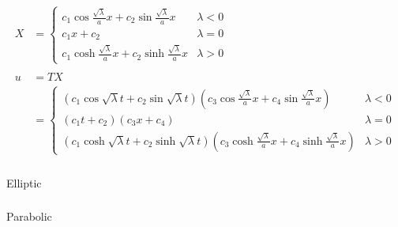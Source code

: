 \documentclass{article}
\begin{document}
\begin{align*}
  X                                     & = \begin{cases}
                                              c_1 \cos \frac{\sqrt{\lambda}}{a} x + c_2 \sin \frac{\sqrt{\lambda}}{a} x   & \lambda < 0 \\
                                              c_1 x + c_2                                                                 & \lambda = 0 \\
                                              c_1 \cosh \frac{\sqrt{\lambda}}{a} x + c_2 \sinh \frac{\sqrt{\lambda}}{a} x & \lambda > 0
                                            \end{cases}                                                             \\ \\
  u                                     & = T X                                                                                                                                                                     \\
                                        & = \begin{cases}
                                              (c_1 \cos \sqrt{\lambda} t + c_2 \sin \sqrt{\lambda} t) (c_3 \cos \frac{\sqrt{\lambda}}{a} x + c_4 \sin \frac{\sqrt{\lambda}}{a} x)     & \lambda < 0 \\
                                              (c_1 t + c_2) (c_3 x + c_4)                                                                                                             & \lambda = 0 \\
                                              (c_1 \cosh \sqrt{\lambda} t + c_2 \sinh \sqrt{\lambda} t) (c_3 \cosh \frac{\sqrt{\lambda}}{a} x + c_4 \sinh \frac{\sqrt{\lambda}}{a} x) & \lambda > 0
                                            \end{cases}
\end{align*}

\setcounter{subsubsection}{16}
\subsubsection{}

Elliptic

\setcounter{subsubsection}{18}
\subsubsection{}

Parabolic
\end{document}
